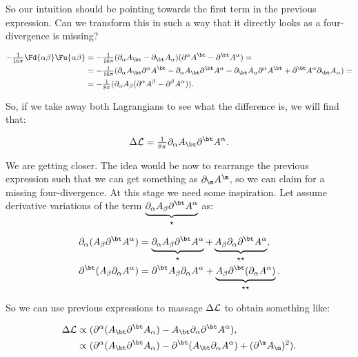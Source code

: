 So our intuition should be pointing towards the first term in the previous expression. Can we transform this in such a way that it directly looks as a four-divergence is missing?

\begin{equation}
	\begin{split}
		-\tfrac{1}{16 \pi} \Fd{\alpha\beta} \Fu{\alpha\beta} &= -\tfrac{1}{16 \pi} (\pd{\alpha}\vad{\bt}-\pd{\bt}\vad{\alpha})(\pu{\alpha}\vau{\bt}-\pu{\bt}\vau{\alpha}) =\\
		& = 	-\tfrac{1}{16 \pi}(\pd{\alpha}\vad{\bt}\pu{\alpha}\vau{\bt} - \pd{\alpha}\vad{\bt}\pu{\bt}\vau{\alpha} - \pd{\bt}\vad{\alpha}\pu{\alpha}\vau{\bt} +  \pu{\bt}\vau{\alpha}\pd{\bt}\vad{\alpha})=\\
		&= 	-\tfrac{1}{8 \pi} (\pd{\alpha}\vad{\beta}(\pu{\alpha}\vau{\beta}-\pu{\beta}\vau{\alpha})).
	\end{split}
\end{equation}

So, if we take away both Lagrangians to see what the difference is, we will find that:

\begin{equation}\label{differencematl}
	\Delta\matL = \tfrac{1}{8\pi} \pd{\alpha}\vad{\bt}\pu{\bt}\vau{\alpha}.
\end{equation}

We are getting closer. The idea would be now to rearrange the previous expression such that we can get something as $\pd{\m}\vau{\m}$, so we can claim for a missing four-divergence. At this stage we need some inspiration. Let assume derivative variations of the term $\underbrace{\pd{\alpha}\vad{\beta}\pu{\bt}\vau{\alpha}}_{\star}$ as:

\begin{equation}
	\begin{split}
		\pd{\alpha}(\vad{\beta}\pu{\bt}\vau{\alpha}) &= \underbrace{\pd{\alpha}\vad{\beta}\pu{\bt}\vau{\alpha}}_{\star} + \underbrace{\vad{\beta}\pd{\alpha}\pu{\bt}\vau{\alpha}}_{\star \star},\\
		\pu{\bt}(\vad{\beta}\pd{\alpha}\vau{\alpha}) &= \pu{\bt}\vad{\beta}\pd{\alpha}\vau{\alpha} + \underbrace{\vad{\beta}\pu{\bt}(\pd{\alpha}\vau{\alpha})}_{\star \star}.
	\end{split}
\end{equation}

So we can use previous expressions to massage $\Delta\mathcal{L}$ to obtain something like:

\begin{equation}
	\begin{split}
		\Delta\matL &\propto (\pu{\alpha}(\vad{\bt}\pu{\bt}\vad{\alpha}) - \vad{\bt} \pd{\alpha}\pu{\bt}\vau{\alpha}),\\
		&\propto (\pu{\alpha}(\vad{\bt}\pu{\bt}\vad{\alpha}) -\pu{\bt}(\vad{\bt}\pd{\alpha}\vau{\alpha})+ (\pu{\m}\vad{\m})^{2}).\\
	\end{split}
\end{equation}

